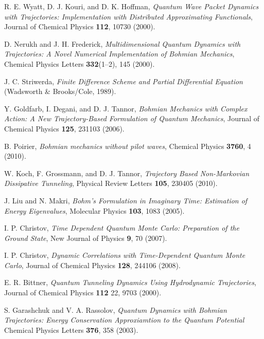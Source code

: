 \documentclass[nofootinbib, secnumarabic, amsmath, nobibnotes,11pt,aps,pra, floatfix]{revtex4-1}
\begin{document}
\begin{thebibliography}{999}
R. E. Wyatt, D. J. Kouri, and D. K. Hoffman, \emph{Quantum Wave Packet Dynamics with Trajectories: Implementation with Distributed Approximating Functionals}, Journal of Chemical Physics \textbf{112},  10730 (2000).

D. Nerukh and J. H. Frederick, \emph{Multidimensional Quantum Dynamics with Trajectories: A Novel Numerical Implementation of
Bohmian Mechanics}, Chemical Physics Letters \textbf{332}(1--2),  145 (2000).

J. C. Striwerda, \emph{Finite Difference Scheme and Partial Differential Equation} (Wadsworth \& Brooks/Cole, 1989).

Y. Goldfarb, I. Degani, and D. J. Tannor, \emph{Bohmian Mechanics with Complex Action: A New Trajectory-Based Formulation of Quantum Mechanics}, Journal of Chemical Physics \textbf{125},  231103 (2006).

B. Poirier, \emph{Bohmian mechanics without pilot waves}, Chemical Physics \textbf{3760}, 4 (2010).

W. Koch, F. Grossmann, and D. J. Tannor, \emph{Trajectory Based Non-Markovian Dissipative Tunneling}, Physical Review Letters \textbf{105},  230405 (2010).

J. Liu and N. Makri, \emph{Bohm's Formulation in Imaginary Time: Estimation of Energy Eigenvalues}, Molecular Physics \textbf{103},  1083 (2005).

I. P. Christov, \emph{Time Dependent Quantum Monte Carlo: Preparation of the Ground State}, New Journal of Physics \textbf{9},  70 (2007).

I. P. Christov, \emph{Dynamic Correlations with Time-Dependent Quantum Monte Carlo}, Journal of Chemical Physics \textbf{128},  244106 (2008).

E. R. Bittner, \emph{Quantum Tunneling Dynamics Using Hydrodynamic Trajectories}, Journal of Chemical Physics \textbf{112} 22,  9703 (2000).

S. Garashchuk and V. A. Rassolov, \emph{Quantum Dynamics with Bohmian Trajectories: Energy Conservation Approxiamtion to the Quantum Potential} Chemical Physics Letters \textbf{376},  358 (2003).


\end{thebibliography}
\end{document}
